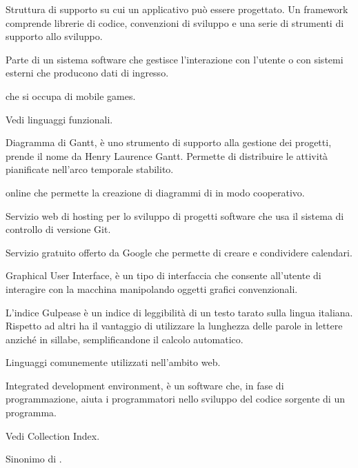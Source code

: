 Struttura di supporto su cui un applicativo può essere progettato.
Un framework comprende librerie di codice, convenzioni di sviluppo e una serie di strumenti di supporto allo sviluppo.

Parte di un sistema software che gestisce l'interazione con l'utente o con sistemi esterni che producono dati di ingresso.

 che si occupa di mobile games.

Vedi linguaggi funzionali.


Diagramma di Gantt, è uno strumento di supporto alla gestione dei progetti, prende il nome da Henry Laurence Gantt.
Permette di distribuire le attività pianificate nell'arco temporale stabilito.

 online che permette la creazione di diagrammi di  in modo cooperativo.

Servizio web di hosting per lo sviluppo di progetti software che usa il sistema di controllo di versione Git.

Servizio gratuito offerto da Google che permette di creare e condividere calendari.

Graphical User Interface, è un tipo di interfaccia che consente all'utente di interagire con la macchina manipolando oggetti grafici convenzionali.

L'indice Gulpease è un indice di leggibilità di un testo tarato sulla lingua italiana. Rispetto ad altri ha il vantaggio di utilizzare la lunghezza delle parole in lettere anziché in sillabe, semplificandone il calcolo automatico.


Linguaggi comunemente utilizzati nell'ambito web.


Integrated development environment,  è un software che, in fase di programmazione, aiuta i programmatori nello sviluppo del codice sorgente di un programma.

Vedi Collection Index.

Sinonimo di .

